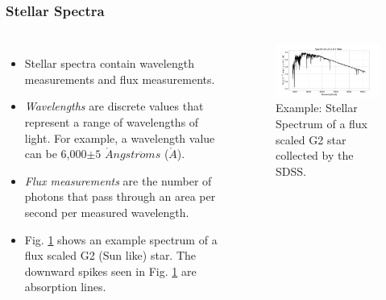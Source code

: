 \documentclass[aspectratio=169]{beamer}
\begin{document}
\begin{frame}
\frametitle{Stellar Spectra}

  \begin{block}

    \begin{columns}[t]

\vspace{-1cm} 
	\begin{itemize}
	\item Stellar spectra contain wavelength measurements and flux measurements. 
	\item \textit{Wavelengths} are discrete values that represent a range of wavelengths of light. For example, a wavelength value can be 6,000$\pm5$ $\mathring{A}ngstr\ddot{o}ms$ ($\mathring{A}$).
	\item  \textit{Flux measurements} are the number of photons that pass through an area per second per measured wavelength. 
\item Fig. \ref{fig:G2} shows an example spectrum of a flux scaled G2 (Sun like) star. The downward spikes seen in Fig. \ref{fig:G2} are absorption lines.
	\end{itemize}
        \begin{figure}[T]
	 \vspace{-1cm} 
	\hspace*{-.5cm} 
            \centering
            \includegraphics[width = 2.9in]{G2.png}
            \caption{Example: Stellar Spectrum of a flux scaled G2 star collected by the SDSS.}
            \label{fig:G2}
        \end{figure}

    \end{columns}
  \end{block}

\end{frame}
\end{document}
